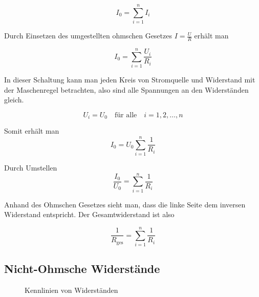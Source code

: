 \documentclass[a4paper,german,12pt,smallheadings]{scrartcl}
\begin{document}
\begin{equation}
  I_0 = \sum_{i=1}^n I_i
\end{equation}

Durch Einsetzen des umgestellten ohmschen Gesetzes $I = \frac{U}{R}$ erhält man

\begin{equation}
  I_0 = \sum_{i=1}^n \frac{U_i}{R_i}
\end{equation}

In dieser Schaltung kann man jeden Kreis von Stromquelle und Widerstand mit der
Maschenregel betrachten, also sind alle Spannungen an den Widerständen gleich.

\begin{equation}
  U_i = U_0 \quad\text{für alle}\quad i = 1, 2, \dots, n
\end{equation}

Somit erhält man
\begin{equation}
  I_0 = U_0 \sum_{i=1}^n \frac{1}{R_i}
\end{equation}

Durch Umstellen
\begin{equation}
  \frac{I_0}{U_0} = \sum_{i=1}^n \frac{1}{R_i}
\end{equation}

Anhand des Ohmschen Gesetzes sieht man, dass die linke Seite dem inversen
Widerstand entspricht. Der Gesamtwiderstand ist also

\begin{equation}
  \frac{1}{R_\text{ges}} = \sum_{i=1}^n \frac{1}{R_i}
\end{equation}

\subsection{Nicht-Ohmsche Widerstände}
\begin{figure}[H]
  \begin{center}
    \caption{Kennlinien von Widerständen}
  \end{center}
\end{figure}
\end{document}
